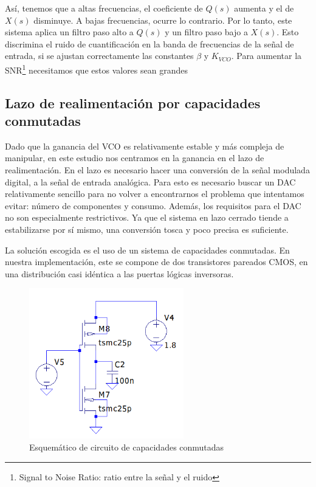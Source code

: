 \documentclass[12pt]{report} %
\begin{document}
	Así, tenemos que a altas frecuencias, el coeficiente de $Q(s)$ aumenta y el de $X(s)$ disminuye. A bajas frecuencias, ocurre lo contrario. Por lo tanto, este sistema aplica un filtro paso alto a $Q(s)$ y un filtro paso bajo a $X(s)$. Esto discrimina el ruido de cuantificación en la banda de frecuencias de la señal de entrada, si se ajustan correctamente las constantes $\beta$ y $K_{VCO}$. Para aumentar la SNR\footnote{Signal to Noise Ratio: ratio entre la señal y el ruido} necesitamos que estos valores sean grandes %
	
	
	\subsection{Lazo de realimentación por capacidades conmutadas}
	
	Dado que la ganancia del VCO es relativamente estable y más compleja de manipular, en este estudio nos centramos en la ganancia en el lazo de realimentación. En el lazo es necesario hacer una conversión de la señal modulada digital, a la señal de entrada analógica. Para esto es necesario buscar un DAC relativamente sencillo para no volver a encontrarnos el problema que intentamos evitar: número de componentes y consumo. Además, los requisitos para el DAC no son especialmente restrictivos. Ya que el sistema en lazo cerrado tiende a estabilizarse por sí mismo, una conversión tosca %
	y poco precisa es suficiente.
	
	La solución escogida es el uso de un sistema de capacidades conmutadas. En nuestra implementación, este se compone de dos transistores pareados CMOS, en una distribución casi idéntica a las puertas lógicas inversoras.
	
	\begin{figure}[H]
		\includegraphics[width=0.6\textwidth]{sw-capacities-sch.png}
		\caption[Esquemático de circuito de capacidades conmutadas]{Esquemático de circuito de capacidades conmutadas}
		\label{fig:sw-capacities-sch.png}
	\end{figure}
	
\end{document}
